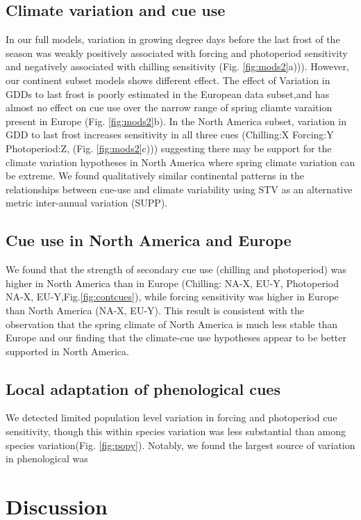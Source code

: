 \documentclass[12pt]{article}\usepackage[]{graphicx}\usepackage[]{color}
\begin{document}
\subsection*{Climate variation and cue use}
In our full models, variation in growing degree days before the last frost of the season was weakly positively associated with forcing and photoperiod sensitivity and negatively associated with chilling sensitivity (Fig. \ref{fig:mods2}a))). However, our continent subset models shows different effect. The effect of Variation in GDDs to last frost is poorly estimated in the European data subset,and has almost no effect on cue use over the narrow range of spring cliamte varaition present in Europe  (Fig. \ref{fig:mods2}b). In the North America subset, variation in GDD to last frost increases sensitivity in all three cues (Chilling:X Forcing:Y Photoperiod:Z, (Fig. \ref{fig:mods2}c))) suggesting there may be support for the climate variation hypotheses in North America where spring climate variation can be extreme. We found qualitatively similar continental patterns in the relationships between cue-use and climate variability  using STV as an alternative metric inter-annual variation (SUPP).


\subsection{Cue use in North America and Europe}
We found that the strength of secondary cue use (chilling and photoperiod) was higher in North America than in Europe (Chilling: NA-X, EU-Y, Photoperiod NA-X, EU-Y,Fig.\ref{fig:contcues}), while forcing sensitivity was higher in Europe than North America (NA-X, EU-Y). This result is consistent with the observation that the spring climate of North America is much less stable than Europe and our finding that the climate-cue use hypotheses appear to be better supported in North America.

\subsection*{Local adaptation of phenological cues}
We detected limited population level variation in forcing and photoperiod cue sensitivity, though this within species variation was less substantial than among species variation(Fig. \ref{fig:popy}). Notably, we found the largest source of variation in phenological was

\section*{Discussion}
\end{document}
